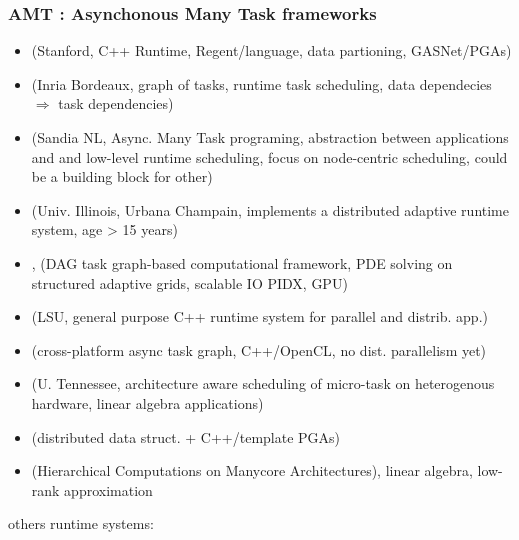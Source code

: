 \begin{frame}
  \frametitle{AMT : Asynchonous Many Task frameworks}
  
  \begin{itemize}
  \item {} (Stanford, C++ Runtime, Regent/language, data partioning, GASNet/PGAs)
  \item {} (Inria Bordeaux, graph of tasks, runtime task scheduling, data dependecies $\Rightarrow$ task dependencies)
  \item {} (Sandia NL, Async. Many Task programing, abstraction between applications and and low-level runtime scheduling, focus on node-centric scheduling, could be a building block for other)
  \item {} (Univ. Illinois, Urbana Champain, implements a distributed adaptive runtime system, age > 15 years)
  \item {}, (DAG task graph-based computational framework, PDE solving on structured adaptive grids, scalable IO PIDX, GPU)
  \item {} (LSU, general purpose C++ runtime system for parallel and distrib. app.)
  \item {} (cross-platform async task graph, C++/OpenCL, no dist. parallelism yet)
  \item {} (U. Tennessee, architecture aware scheduling of micro-task on heterogenous hardware, linear algebra applications)
  \item {} (distributed data struct. + C++/template PGAs)
  \item {} (Hierarchical Computations on Manycore Architectures), linear algebra, low-rank approximation
  \end{itemize}

  {\small
    others runtime systems: \\
  }

  
\end{frame}
